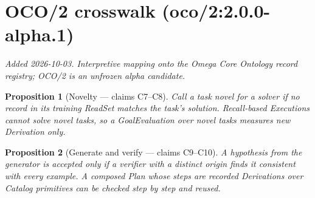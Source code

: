 \documentclass{article}
\newtheorem{proposition}{Proposition}
\begin{document}
\section{OCO/2 crosswalk (oco/2:2.0.0-alpha.1)}
\emph{Added 2026-10-03. Interpretive mapping onto the Omega Core Ontology
record registry; OCO/2 is an unfrozen alpha candidate.}

\begin{proposition}[Novelty --- claims C7--C8]
Call a task novel for a solver if no record in its training ReadSet matches the task's solution. Recall-based Executions cannot solve novel tasks, so a GoalEvaluation over novel tasks measures new Derivation only.
\end{proposition}

\begin{proposition}[Generate and verify --- claims C9--C10]
A hypothesis from the generator is accepted only if a verifier with a distinct origin finds it consistent with every example. A composed Plan whose steps are recorded Derivations over Catalog primitives can be checked step by step and reused.
\end{proposition}
\end{document}
